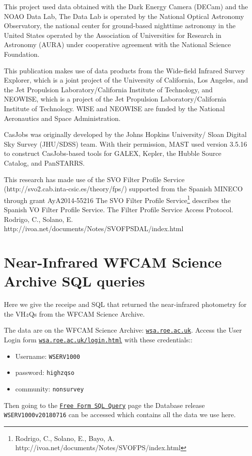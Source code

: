 \documentclass[usenatbib]{mnras}
\begin{document}
This project used data obtained with the Dark Energy Camera (DECam)
and the NOAO Data Lab, The Data Lab is operated by the National
Optical Astronomy Observatory, the national center for ground-based
nighttime astronomy in the United States operated by the Association
of Universities for Research in Astronomy (AURA) under cooperative
agreement with the National Science Foundation.

This publication makes use of data products from the Wide-field
Infrared Survey Explorer, which is a joint project of the University
of California, Los Angeles, and the Jet Propulsion
Laboratory/California Institute of Technology, and NEOWISE, which is a
project of the Jet Propulsion Laboratory/California Institute of
Technology. WISE and NEOWISE are funded by the National Aeronautics
and Space Administration.

CasJobs was originally developed by the Johns Hopkins University/
Sloan Digital Sky Survey (JHU/SDSS) team. With their permission, MAST
used version 3.5.16 to construct CasJobs-based tools for GALEX,
Kepler, the Hubble Source Catalog, and PanSTARRS.

This research has made use of the SVO Filter Profile Service
(http://svo2.cab.inta-csic.es/theory/fps/) supported from the Spanish
MINECO through grant AyA2014-55216 
The SVO Filter Profile Service\footnote{Rodrigo, C., Solano, E., Bayo, A. http://ivoa.net/documents/Notes/SVOFPS/index.html}
describes the Spanish VO Filter Profile Service. 
The Filter Profile Service Access Protocol. Rodrigo, C., Solano, E. http://ivoa.net/documents/Notes/SVOFPSDAL/index.html



\appendix


\section{Near-Infrared WFCAM Science Archive SQL queries}\label{sec:SQL}
Here we give the receipe and SQL that returned the near-infrared photometry 
for the VH$z$Qs from the  WFCAM Science Archive. 

The data are on the WFCAM Science Archive: \href{wsa.roe.ac.uk}{\tt wsa.roe.ac.uk}. 
Access the User Login form \href{WFCAM Science Archive}{\tt wsa.roe.ac.uk/login.html} 
with these credentials::
\begin{itemize}
    \item Username: {\tt WSERV1000} 
    \item password: {\tt highzqso} 
    \item community: {\tt nonsurvey}
\end{itemize}
Then going to the
\href{http://wsa.roe.ac.uk:8080/wsa/SQL_form.jsp}{{\tt Free Form SQL
Query}} page the Database release {\tt WSERV1000v20180716} can be
accessed which contains all the data we use here.
\end{document}
